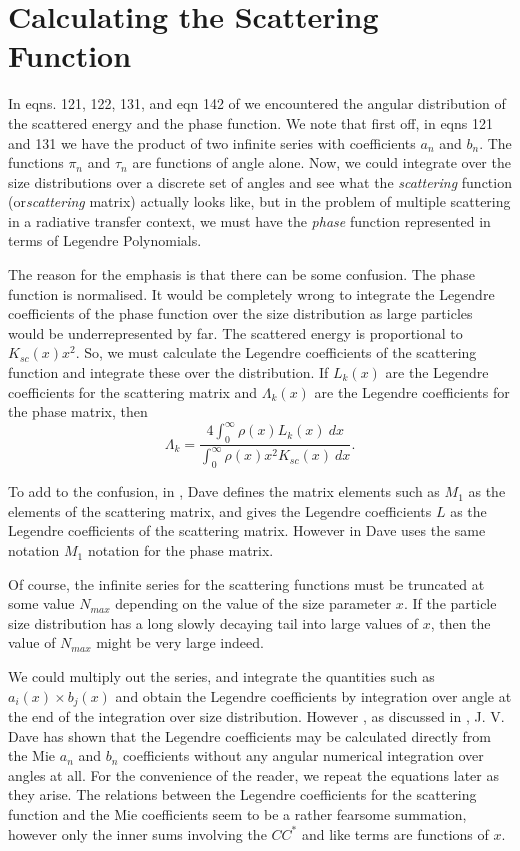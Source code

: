 \section{ Calculating the Scattering Function}

In eqns. 121, 122, 131, and eqn 142 of \cite{EMScatt:Mybib} we encountered the angular
 distribution of the scattered energy and the phase function.
We note that first off, in eqns 121 and 131 we have the product of two 
infinite series with  coefficients $a_n$ and $b_n$.
The functions $\pi_n$ and $\tau_n$ are functions of angle alone.
 Now, we could integrate over the size distributions
over a discrete set of angles and see what the {\it scattering} function
 (or{\it  scattering} matrix) actually looks like, but in
  the problem of 
multiple scattering in a radiative transfer context,
  we must have the {\it phase } function represented in
 terms of Legendre Polynomials. 

The reason for the emphasis is that there can be some confusion. The phase function
is normalised. It would be completely wrong to integrate the Legendre
coefficients of the phase function over the size distribution as large
 particles would be underrepresented
by far. The scattered energy is proportional to $K_{sc}(x) x^2$. So, we must
calculate the Legendre coefficients of the scattering function and integrate these
over the distribution. If $L_k(x)$ are the Legendre coefficients for the
 scattering matrix
and $\Lambda_k(x)$ are the Legendre coefficients for the phase matrix, then
\begin{equation}
\Lambda_k=\frac{ 
4\int_0^\infty \rho(x) L_k(x) \> dx }{
\int_0^\infty \rho(x) x^2 K_{sc}(x) \> dx }.
\end{equation}


To add to the confusion,
in \cite{Dave1:Mybib}, Dave defines the matrix elements such as $M_1$ as
the elements of the scattering matrix, and gives the Legendre coefficients $L$
as the Legendre coefficients of the scattering matrix. However in \cite{Dave2:Mybib}
Dave uses the same notation $M_1$ notation for the phase matrix.


Of course, the infinite series for the  scattering functions must 
be truncated at some value 
$N_{max}$ depending on the value 
of the size parameter $x$. If the particle size distribution 
has a long slowly decaying tail into large values of  $x$, then the 
value of $N_{max}$ might be very large indeed.


We could multiply out the series, and integrate the quantities such as
$a_i(x) \times b_j(x)$ and obtain the Legendre coefficients by integration over angle
at the end of the integration over size distribution.
However \cite{Dave1:Mybib}, as discussed in  \cite{Vector:Mybib}, J. V. Dave has 
shown that the Legendre coefficients
 may be calculated directly from the Mie $a_n$ and $b_n$ coefficients 
without any angular numerical integration over angles 
 at all. For the convenience of the reader, we repeat the
 equations later as they arise.
The relations between the Legendre coefficients for 
the scattering function and the Mie coefficients
 seem to be a rather fearsome summation, however only the inner
sums  involving the $C C^*$ and like terms are functions of $x$.

